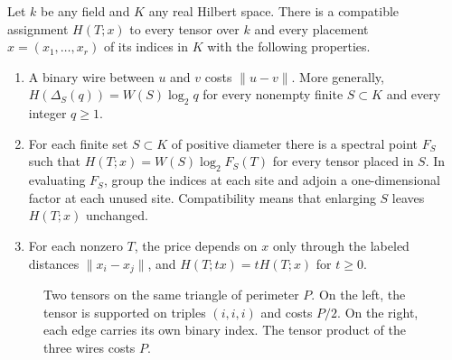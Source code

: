 \begin{theorem}\label{thm:main}
Let \(k\) be any field and \(K\) any real Hilbert space. There is a
compatible assignment \(H(T;x)\) to every tensor over \(k\) and every
placement \(x=(x_1,\ldots,x_r)\) of its indices in \(K\) with the
following properties.
\begin{enumerate}[leftmargin=*,itemsep=.35ex]
\item A binary wire between \(u\) and \(v\) costs \(\|u-v\|\).
More generally, \(H(\Delta_S(q))=W(S)\log_2 q\) for every nonempty
finite \(S\subset K\) and every integer \(q\ge1\).
\item For each finite set \(S\subset K\) of positive diameter there is
a spectral point \(F_S\) such that \(H(T;x)=W(S)\log_2 F_S(T)\) for
every tensor placed in \(S\). In evaluating \(F_S\), group the
indices at each site and adjoin a one-dimensional factor at each unused
site. Compatibility means that enlarging \(S\) leaves \(H(T;x)\)
unchanged.
\item For each nonzero \(T\), the price depends on \(x\) only through
the labeled distances \(\|x_i-x_j\|\), and \(H(T;tx)=tH(T;x)\) for
\(t\ge0\).
\end{enumerate}
\end{theorem}

\begin{figure}[htbp]
\centering
{}
\caption{Two tensors on the same triangle of perimeter \(P\). On the
left, the tensor is supported on triples \((i,i,i)\) and costs \(P/2\).
On the right, each edge carries its own binary index. The tensor product
of the three wires costs \(P\).}
\label{fig:triangle}
\end{figure}

